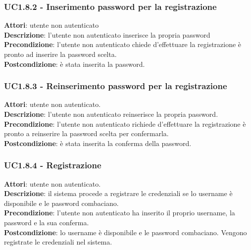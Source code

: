 	\subsubsection{UC1.8.2 - Inserimento password per la registrazione} {
		\label{uc1.8.2}
		\textbf{Attori}: utente non autenticato \\
		\textbf{Descrizione}: l'utente non autenticato inserisce la propria password	\\
		\textbf{Precondizione}: l'utente non autenticato chiede d'effettuare la registrazione è pronto ad inserire la password scelta.	\\
		\textbf{Postcondizione}: è stata inserita la password.	\\
		}
	\subsubsection{UC1.8.3 - Reinserimento password per la registrazione} {
		\label{uc1.8.3}
		\textbf{Attori}: utente non autenticato. \\
		\textbf{Descrizione}: l'utente non autenticato reinserisce la propria password.	\\
		\textbf{Precondizione}: l'utente non autenticato richiede d'effettuare la registrazione è pronto a reinserire la password scelta per confermarla.	\\
		\textbf{Postcondizione}: è stata inserita la conferma della password.	\\
		}
	\subsubsection{UC1.8.4 - Registrazione} {
		\label{uc1.8.4}
		\textbf{Attori}: utente non autenticato. \\
		\textbf{Descrizione}: il sistema procede a registrare le credenziali se lo username è disponibile e le password combaciano.	\\
		\textbf{Precondizione}: l'utente non autenticato ha inserito il proprio username, la password e la sua conferma.	\\
		\textbf{Postcondizione}: lo username è disponibile e le password combaciano. Vengono registrate le credenziali nel sistema.	\\
		}